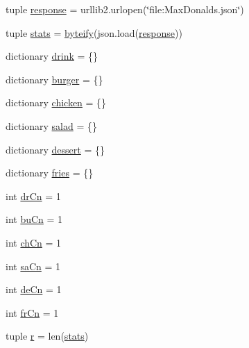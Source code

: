 \begin{DoxyCompactItemize}
\item 
tuple \hyperlink{namespacechickenRun0_a14223aed36f27a22742b06f9698c06a4}{response} = urllib2.\-urlopen(\char`\"{}file\-:\-Max\-Donalds.\-json\char`\"{})
\item 
tuple \hyperlink{namespacechickenRun0_a7498517386ad443ac950fd093cb6e7a6}{stats} = \hyperlink{namespacechickenRun0_abd898ac5f9a46a6ed157742ac067674a}{byteify}(json.\-load(\hyperlink{namespacechickenRun0_a14223aed36f27a22742b06f9698c06a4}{response}))
\item 
dictionary \hyperlink{namespacechickenRun0_a475ad43e9de896f9a0782e9aa5504f8c}{drink} = \{\}
\item 
dictionary \hyperlink{namespacechickenRun0_a70fbb80b56c057e142edc19c143c6cd4}{burger} = \{\}
\item 
dictionary \hyperlink{namespacechickenRun0_aa82cb1076988299bd35184a083665f86}{chicken} = \{\}
\item 
dictionary \hyperlink{namespacechickenRun0_afe309d6f6c9cb974a3e3cdd459ba4e49}{salad} = \{\}
\item 
dictionary \hyperlink{namespacechickenRun0_a92135454144f5798969cf77ac76af7a9}{dessert} = \{\}
\item 
dictionary \hyperlink{namespacechickenRun0_ac24c3a3f366da81659235647930187b8}{fries} = \{\}
\item 
int \hyperlink{namespacechickenRun0_ad0fb72b77ed7ae37cc3d23edd05cd697}{dr\-Cn} = 1
\item 
int \hyperlink{namespacechickenRun0_a0fc985e726920e4216f96afc32778af9}{bu\-Cn} = 1
\item 
int \hyperlink{namespacechickenRun0_ad53fcd9b18be68bf2e1a22e6c321715d}{ch\-Cn} = 1
\item 
int \hyperlink{namespacechickenRun0_aea5c25f9af132c481e1a6466f3381165}{sa\-Cn} = 1
\item 
int \hyperlink{namespacechickenRun0_a19f198e118a08e3267d9e38351d9d744}{de\-Cn} = 1
\item 
int \hyperlink{namespacechickenRun0_a2983b8cf5a7f8aab95e80e4969533060}{fr\-Cn} = 1
\item 
tuple \hyperlink{namespacechickenRun0_a9bb73b5b5e7c3efe92b9dca9972096b3}{r} = len(\hyperlink{namespacechickenRun0_a7498517386ad443ac950fd093cb6e7a6}{stats})
\end{DoxyCompactItemize}


